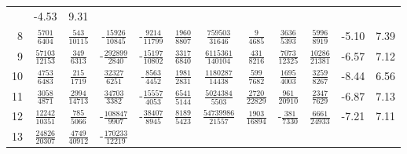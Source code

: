 \documentclass[letterpaper,11pt,nointlimits,reqno,draft]{amsbook}
\begin{document}
\begin{table}
\begin{tabular}{r|ccccccccc|c@{ -- }c@{\%}}
&  -4.53 &  9.31
\\
8
&  $\frac{            5701}{            6404}$
&  $\frac{             543}{           10115}$
& -$\frac{           15926}{           10845}$
& -$\frac{            9214}{           11799}$
&  $\frac{            1960}{            8807}$
&  $\frac{          759503}{           31646}$
&  $\frac{               9}{            4685}$
&  $\frac{            3636}{            5393}$
&  $\frac{            5996}{            8919}$
&  -5.10 &  7.39
\\
9
&  $\frac{           57103}{           12153}$
&  $\frac{             349}{            6313}$
& -$\frac{          292899}{            2840}$
& -$\frac{           15197}{           10802}$
&  $\frac{            3317}{            6840}$
&  $\frac{         6115361}{          140104}$
&  $\frac{             431}{            8216}$
&  $\frac{            7073}{           12325}$
&  $\frac{           10286}{           21381}$
&  -6.57 &  7.12
\\
10
&  $\frac{            4753}{            6483}$
&  $\frac{             215}{            1719}$
&  $\frac{           32327}{            6251}$
& -$\frac{            8563}{            4452}$
&  $\frac{            1981}{            2831}$
&  $\frac{         1180287}{           14438}$
&  $\frac{             599}{            7682}$
&  $\frac{            1695}{            4003}$
&  $\frac{            3259}{            8267}$
&  -8.44 &  6.56
\\
11
&  $\frac{            3058}{            4871}$
&  $\frac{            2994}{           14713}$
&  $\frac{           34703}{            3382}$
& -$\frac{           15557}{            4053}$
&  $\frac{            6541}{            5144}$
&  $\frac{         5024384}{            5503}$
&  $\frac{            2720}{           22829}$
&  $\frac{             961}{           20910}$
&  $\frac{            2347}{            7629}$
&  -6.87 &  7.13
\\
12
&  $\frac{           12242}{           10351}$
&  $\frac{             785}{            5066}$
& -$\frac{          108847}{            9907}$
& -$\frac{           38407}{            8945}$
&  $\frac{            8189}{            5423}$
&  $\frac{        54739986}{           21557}$
&  $\frac{            1903}{           16894}$
& -$\frac{             381}{            7330}$
&  $\frac{            6661}{           24933}$
&  -7.21 &  7.11
\\
13
&  $\frac{           24826}{           20307}$
&  $\frac{            4749}{           40912}$
& -$\frac{          170233}{           12219}$

\end{tabular}
\end{table}
\end{document}
